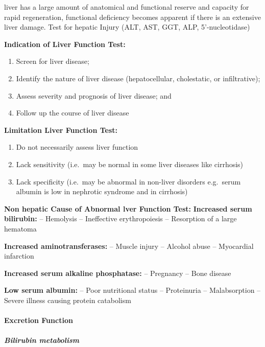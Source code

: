 \documentclass[
  letterpaper,
  DIV=11,
  numbers=noendperiod]{scrreprt}
\let\oldparagraph\paragraph
\renewcommand{\paragraph}[1]{\oldparagraph{#1}\mbox{}}
\let\oldsubparagraph\subparagraph
\renewcommand{\subparagraph}[1]{\oldsubparagraph{#1}\mbox{}}
\providecommand{\tightlist}{%
  \setlength{\itemsep}{0pt}\setlength{\parskip}{0pt}}\usepackage{longtable,booktabs,array}
\begin{document}
liver has a large amount of anatomical and functional reserve and
capacity for rapid regeneration, functional deficiency becomes apparent
if there is an extensive liver damage. Test for hepatic Injury (ALT,
AST, GGT, ALP, 5'-nucleotidase)

\textbf{Indication of Liver Function Test:}

\begin{enumerate}
\def\labelenumi{\arabic{enumi}.}
\tightlist
\item
  Screen for liver disease;
\item
  Identify the nature of liver disease (hepatocellular, cholestatic, or
  infiltrative);
\item
  Assess severity and prognosis of liver disease; and
\item
  Follow up the course of liver disease
\end{enumerate}

\textbf{Limitation Liver Function Test:}

\begin{enumerate}
\def\labelenumi{\arabic{enumi}.}
\tightlist
\item
  Do not necessarily assess liver function
\item
  Lack sensitivity (i.e.~may be normal in some liver diseases like
  cirrhosis)
\item
  Lack specificity (i.e.~may be abnormal in non-liver disorders
  e.g.~serum albumin is low in nephrotic syndrome and in cirrhosis)
\end{enumerate}

\textbf{Non hepatic Cause of Abnormal lver Function Test:}
\textbf{Increased serum bilirubin:} -- Hemolysis -- Ineffective
erythropoiesis -- Resorption of a large hematoma

\textbf{Increased aminotransferases:} -- Muscle injury -- Alcohol abuse
-- Myocardial infarction

\textbf{Increased serum alkaline phosphatase:} -- Pregnancy -- Bone
disease

\textbf{Low serum albumin:} -- Poor nutritional status -- Proteinuria --
Malabsorption -- Severe illness causing protein catabolism

\paragraph{Excretion Function}\label{excretion-function}

\subparagraph{Bilirubin metabolism}\label{bilirubin-metabolism}
\end{document}
